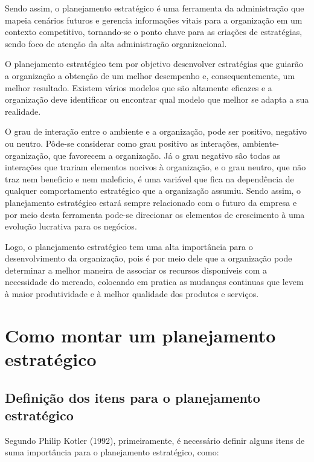 \documentclass[
	12pt,				%
	openright,			%
	oneside,			%
	a4paper,			%
	english,			%
	french,				%
	spanish,			%
	brazil				%
	]{abntex2}
\begin{document}
Sendo assim, o planejamento estratégico é uma ferramenta da administração que mapeia cenários futuros e gerencia informações vitais para a organização em um contexto competitivo, tornando-se o ponto chave para as criações de estratégias, sendo foco de atenção da alta administração organizacional.

O planejamento estratégico tem por objetivo desenvolver estratégias que guiarão a organização a obtenção de um melhor desempenho e, consequentemente, um melhor resultado. Existem vários modelos que são altamente eficazes e a organização deve identificar ou encontrar qual modelo que melhor se adapta a sua realidade.

O grau de interação entre o ambiente e a organização, pode ser positivo, negativo ou neutro. Pôde-se considerar como grau positivo as interações, ambiente-organização, que favorecem a organização. Já o grau negativo são todas as interações que trariam elementos nocivos à organização, e o grau neutro, que não traz nem beneficio e nem maleficio, é uma variável que fica na dependência de qualquer comportamento estratégico que a organização assumiu. Sendo assim, o planejamento estratégico estará sempre relacionado com o futuro da empresa e por meio desta ferramenta pode-se direcionar os elementos de crescimento à uma evolução lucrativa para os negócios.

Logo, o planejamento estratégico tem uma alta importância para o desenvolvimento da organização, pois é por meio dele que a organização pode determinar a melhor maneira de associar os recursos disponíveis com a necessidade do mercado, colocando em pratica as mudanças continuas que levem à maior produtividade e à melhor qualidade dos produtos e serviços. 

\section[Como montar um planejamento estratégico]{Como montar um planejamento estratégico}

\subsection[Definição dos itens para o planejamento estratégico]{Definição dos itens para o planejamento estratégico}

	Segundo Philip Kotler (1992), primeiramente, é necessário definir alguns itens de suma importância para o planejamento estratégico, como:
	
\end{document}
